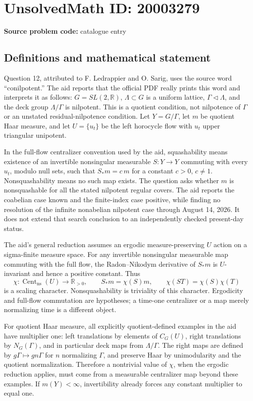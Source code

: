 \documentclass[11pt]{article}
\newcommand{\R}{\mathbb{R}}
\begin{document}
\section*{UnsolvedMath ID: 20003279}
\textbf{Source problem code:} catalogue entry
\subsection{Definitions and mathematical statement}
Question 12, attributed to F. Ledrappier and O. Sarig, uses the source word ``conilpotent.'' The aid reports that the official PDF really prints this word and interprets it as follows: $G=SL(2,\R)$, $\Lambda\subset G$ is a uniform lattice, $\Gamma\triangleleft\Lambda$, and the deck group $\Lambda/\Gamma$ is nilpotent. This is a quotient condition, not nilpotence of $\Gamma$ or an unstated residual-nilpotence condition. Let $Y=G/\Gamma$, let $m$ be quotient Haar measure, and let $U=\{u_t\}$ be the left horocycle flow with $u_t$ upper triangular unipotent.

In the full-flow centralizer convention used by the aid, squashability means existence of an invertible nonsingular measurable $S:Y\to Y$ commuting with every $u_t$, modulo null sets, such that $S_*m=c\,m$ for a constant $c>0$, $c\ne1$. Nonsquashability means no such map exists. The question asks whether $m$ is nonsquashable for all the stated nilpotent regular covers. The aid reports the coabelian case known and the finite-index case positive, while finding no resolution of the infinite nonabelian nilpotent case through August 14, 2026. It does not extend that search conclusion to an independently checked present-day status.

The aid's general reduction assumes an ergodic measure-preserving $U$ action on a sigma-finite measure space. For any invertible nonsingular measurable map commuting with the full flow, the Radon--Nikodym derivative of $S_*m$ is $U$-invariant and hence a positive constant. Thus
\[
 \chi:\operatorname{Cent}_{\mathrm{ns}}(U)\longrightarrow\R_{>0},
 \qquad S_*m=\chi(S)m,
 \qquad\chi(ST)=\chi(S)\chi(T)
\]
is a scaling character. Nonsquashability is triviality of this character. Ergodicity and full-flow commutation are hypotheses; a time-one centralizer or a map merely normalizing time is a different object.

For quotient Haar measure, all explicitly quotient-defined examples in the aid have multiplier one: left translations by elements of $C_G(U)$, right translations by $N_G(\Gamma)$, and in particular deck maps from $\Lambda/\Gamma$. The right maps are defined by $g\Gamma\mapsto gn\Gamma$ for $n$ normalizing $\Gamma$, and preserve Haar by unimodularity and the quotient normalization. Therefore a nontrivial value of $\chi$, when the ergodic reduction applies, must come from a measurable centralizer map beyond these examples. If $m(Y)<\infty$, invertibility already forces any constant multiplier to equal one.
\end{document}
